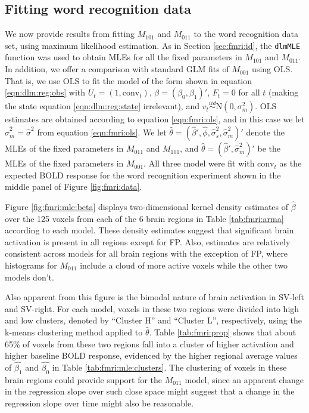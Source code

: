 \subsection{Fitting word recognition data \label{sec:fmri:mle}}

We now provide results from fitting $M_{101}$ and $M_{011}$ to the word recognition data set, using maximum likelihood estimation. As in Section \ref{sec:fmri:id}, the {\tt dlmMLE} function was used to obtain MLEs for all the fixed parameters in $M_{101}$ and $M_{011}$. In addition, we offer a comparison with standard GLM fits of $M_{001}$ using OLS. That is, we use OLS to fit the model of the form shown in equation \eqref{eqn:dlm:reg:obs} with $U_t = (1, \mbox{conv}_t)$, $\beta = (\beta_0,\beta_1)'$, $F_t = 0$ for all $t$ (making the state equation \eqref{eqn:dlm:reg:state} irrelevant), and $v_t \stackrel{iid}{\sim} \mbox{N}(0,\sigma^2_m)$. OLS estimates are obtained according to equation \eqref{eqn:fmri:ols}, and in this case we let $\hat{\sigma}^2_m = \hat{\sigma}^2$ from equation \eqref{eqn:fmri:ols}. We let $\hat{\theta} = (\hat{\beta}',\hat{\phi},\hat{\sigma}^2_s,\hat{\sigma}^2_m)'$ denote the MLEs of the fixed parameters in $M_{011}$ and $M_{101}$, and $\hat{\theta} = (\hat{\beta}',\hat{\sigma}^2_m)'$ be the MLEs of the fixed parameters in $M_{001}$. All three model were fit with $\mbox{conv}_t$ as the expected BOLD response for the word recognition experiment shown in the middle panel of Figure \ref{fig:fmri:data}.

Figure \ref{fig:fmri:mle:beta} displays two-dimensional kernel density estimates of $\hat{\beta}$ over the 125 voxels from each of the 6 brain regions in Table \ref{tab:fmri:arma} according to each model. These density estimates suggest that significant brain activation is present in all regions except for FP. Also, estimates are relatively consistent across models for all brain regions with the exception of FP, where histograms for $M_{011}$ include a cloud of more active voxels while the other two models don't.

Also apparent from this figure is the bimodal nature of brain activation in SV-left and SV-right. For each model, voxels in these two regions were divided into high and low clusters, denoted by ``Cluster H'' and ``Cluster L'', respectively, using the k-means clustering method \citep{hartigan:wong:kmeans:1979} applied to $\hat{\theta}$. Table \ref{tab:fmri:prop} shows that about 65\% of voxels from these two regions fall into a cluster of higher activation and higher baseline BOLD response, evidenced by the higher regional average values of $\hat{\beta_1}$ and $\hat{\beta_0}$ in Table \ref{tab:fmri:mle:clusters}. The clustering of voxels in these brain regions could provide support for the $M_{011}$ model, since an apparent change in the regression slope over such close space might suggest that a change in the regression slope over time might also be reasonable.

